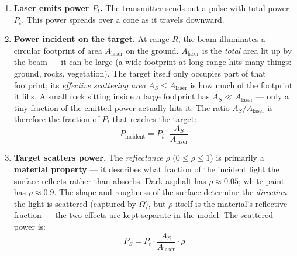 \documentclass[12pt, a4paper]{article}
\begin{document}
\begin{enumerate}[leftmargin=1.6em,itemsep=4pt]
  \item \textbf{Laser emits power $P_t$.}
    The transmitter sends out a pulse with total power $P_t$.
    This power spreads over a cone as it travels downward.

  \item \textbf{Power incident on the target.}
    At range $R$, the beam illuminates a circular footprint of area
    $A_\text{laser}$ on the ground.
    $A_\text{laser}$ is the \emph{total} area lit up by the beam --- it can
    be large (a wide footprint at long range hits many things: ground, rocks,
    vegetation).
    The target itself only occupies part of that footprint; its
    \emph{effective scattering area} $A_S \leq A_\text{laser}$ is how much
    of the footprint it fills.
    A small rock sitting inside a large footprint has $A_S \ll A_\text{laser}$
    --- only a tiny fraction of the emitted power actually hits it.
    The ratio $A_S / A_\text{laser}$ is therefore the fraction of $P_t$ that
    reaches the target:
    \[
      P_\text{incident} = P_t \cdot \frac{A_S}{A_\text{laser}}
    \]

  \item \textbf{Target scatters power.}
    The \emph{reflectance} $\rho$ ($0 \leq \rho \leq 1$) is primarily a
    \textbf{material property} --- it describes what fraction of the incident
    light the surface reflects rather than absorbs.
    Dark asphalt has $\rho \approx 0.05$; white paint has $\rho \approx 0.9$.
    The shape and roughness of the surface determine the \emph{direction} the
    light is scattered (captured by $\Omega$), but $\rho$ itself is the
    material's reflective fraction --- the two effects are kept separate in
    the model.
    The scattered power is:
    \[
      P_S = P_t \cdot \frac{A_S}{A_\text{laser}} \cdot \rho
    \]


\end{enumerate}
\end{document}

